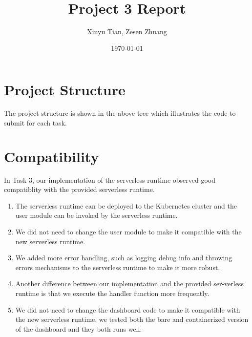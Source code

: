 \documentclass[11pt]{report}
\author{Xinyu Tian, Zesen Zhuang}
\date{\today}
\title{Project 3 Report}
\begin{document}
\maketitle

\setlength{\parindent}{0em}
\setlength{\parskip}{0.3em}

\section{Project Structure}


The project structure is shown in the above tree which illustrates the code to submit for each task.

\section{Compatibility}

In Task 3, our implementation of the serverless runtime observed good compatiblity with the provided serverless runtime. 

\begin{enumerate}
    \item The serverless runtime can be deployed to the Kubernetes cluster and the user module can be invoked by the serverless runtime.
    \item We did not need to change the user module to make it compatible with the new serverless runtime.
    \item We added more error handling, such as logging debug info and throwing errors mechanisms to the serverless runtime to make it more robust.
    \item Another difference between our implementation and the provided ser-verless runtime is that we execute the handler function more frequently.
    \item We did not need to change the dashboard code to make it compatible with the new serverless runtime. we tested both the bare and containerized version of the dashboard and they both runs well.
\end{enumerate}
\end{document}
